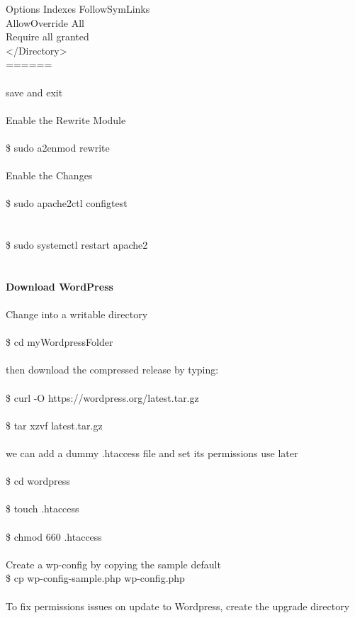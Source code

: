 \documentclass[10pt,a4paper]{article}
\begin{document}
{{{{{{{{{{{{{{{{{{        Options Indexes FollowSymLinks\\
        AllowOverride All \\
        Require all granted\\
</Directory>\\
======\\
\\
save and exit\\
\\
Enable the Rewrite Module\\
\\
\$ sudo a2enmod rewrite\\
\\
Enable the Changes\\
\\
\$ sudo apache2ctl configtest\\
\\
\\
\$ sudo systemctl restart apache2\\
\\
\\
\textbf{Download WordPress}}{\large \\
\\
Change into a writable directory \\
\\
\$ cd myWordpressFolder\\
\\
then download the compressed release by typing:\\
\\
\$ curl -O https://wordpress.org/latest.tar.gz}{\large \\
\\
\$ tar xzvf latest.tar.gz\\
\\
we can add a dummy .htaccess file and set its permissions use later\\
\\
\$ cd wordpress\\
\\
\$ touch .htaccess\\
\\
\$ chmod 660 .htaccess\\
\\
Create a wp-config by copying the sample default\\
\$ cp wp-config-sample.php wp-config.php\\
\\
To fix permissions issues on update to Wordpress, create the upgrade directory\\
}}}}}}}}}}}}}}}}}}
\end{document}
